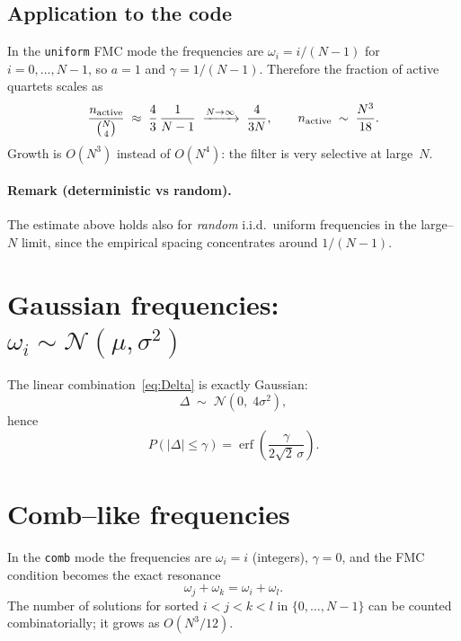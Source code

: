 \documentclass[a4paper,11pt]{article}
\begin{document}
\subsection{Application to the code}

In the \texttt{uniform} FMC mode the frequencies are
$\omega_i = i/(N-1)$ for $i=0,\dots,N-1$, so $a = 1$ and
$\gamma = 1/(N{-}1)$.  Therefore the fraction of active quartets scales as
\begin{equation}
  \frac{n_{\rm active}}{\binom{N}{4}}
  \;\approx\; \frac{4}{3}\,\frac{1}{N-1}
  \;\xrightarrow{N\to\infty}\; \frac{4}{3N},
  \qquad
  n_{\rm active} \;\sim\; \frac{N^3}{18} .
\end{equation}
Growth is $O(N^3)$ instead of $O(N^4)$: the filter is very selective at
large~$N$.

\paragraph{Remark (deterministic vs random).}
The estimate above holds also for \emph{random} i.i.d.\ uniform
frequencies in the large--$N$ limit, since the empirical spacing
concentrates around $1/(N{-}1)$.

\section{Gaussian frequencies: $\omega_i \sim \mathcal{N}(\mu,\sigma^2)$}

The linear combination~\eqref{eq:Delta} is exactly Gaussian:
\begin{equation}
  \Delta \;\sim\; \mathcal{N}(0,\; 4\sigma^2) ,
\end{equation}
hence
\begin{equation}\label{eq:gauss-P}
  \boxed{
  P\!\left(|\Delta|\leq\gamma\right)
  = \operatorname{erf}\!\left(\frac{\gamma}{2\sqrt{2}\,\sigma}\right) .}
\end{equation}

\section{Comb--like frequencies}

In the \texttt{comb} mode the frequencies are $\omega_i = i$ (integers),
$\gamma = 0$, and the FMC condition becomes the exact resonance
\begin{equation}
  \omega_j + \omega_k = \omega_i + \omega_l .
\end{equation}
The number of solutions for sorted $i<j<k<l$ in $\{0,\dots,N{-}1\}$
can be counted combinatorially; it grows as $O(N^3/12)$.
\end{document}
